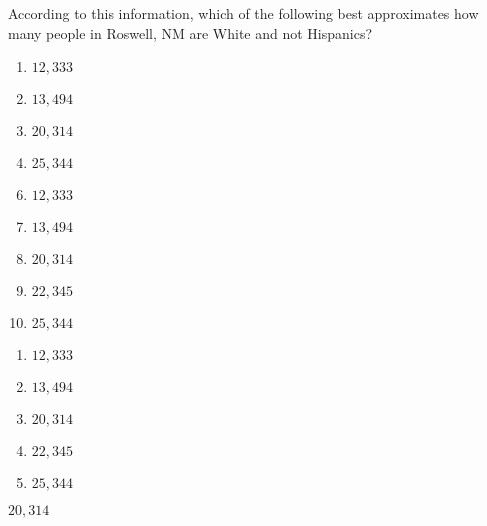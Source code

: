 
According to this information, which of the following best approximates how many people in Roswell, NM are White and not Hispanics?


\ifsat
	\begin{enumerate}[label=\Alph*)]
		\item $12,333 $ 
		\item $13,494 $ 
		\item $20,314 $ %
		\item $25,344 $
	\end{enumerate}
\else
\fi

\ifacteven
	\begin{enumerate}[label=\textbf{\Alph*.},itemsep=\fill,align=left]
		\setcounter{enumii}{5}
		\item $12,333 $ 
		\item $13,494 $ 
		\item $20,314 $ %
		\addtocounter{enumii}{1}
		\item $22,345 $
		\item $25,344 $
	\end{enumerate}
\else
\fi

\ifactodd
	\begin{enumerate}[label=\textbf{\Alph*.},itemsep=\fill,align=left]
		\item $12,333 $ 
		\item $13,494 $ 
		\item $20,314 $ %
		\item $22,345 $
		\item $25,344 $
	\end{enumerate}
\else
\fi

\ifgridin
 $20,314 $ %
		
\else
\fi

